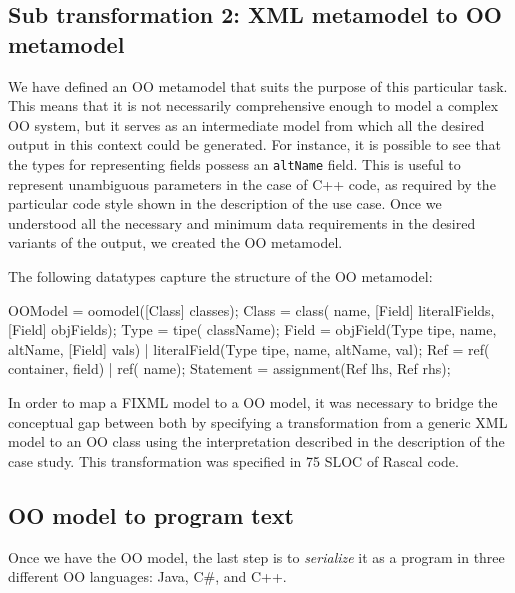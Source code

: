 \documentclass[submission,copyright,creativecommons]{eptcs}
\begin{document}
\subsection{Sub transformation 2: XML metamodel to OO metamodel}

We have defined an OO metamodel that suits the purpose of this particular task. This means that it is not necessarily comprehensive enough to model a complex OO system, but it serves as an intermediate model from which all the desired output in this context could be generated. For instance, it is possible to see that the types for representing fields possess an \texttt{altName} field. This is useful to represent unambiguous parameters in the case of C++ code, as required by the particular code style shown in the description of the use case. Once we understood all the necessary and minimum data requirements in the desired variants of the output, we created the OO metamodel.

The following datatypes capture the structure of the OO metamodel:
\begin{rascal}
 OOModel = oomodel([Class] classes);
 Class = class( name, [Field] literalFields, [Field] objFields);
 Type = tipe( className);
 Field = objField(Type tipe,  name,  altName, [Field] vals) 
           | literalField(Type tipe,  name,  altName,  val);
 Ref = ref( container,  field) | ref( name);
 Statement = assignment(Ref lhs, Ref rhs);
\end{rascal}

In order to map a FIXML model to a OO model, it was necessary to bridge the conceptual gap between both by specifying a transformation from a generic XML model to an OO class using the interpretation described in the description of the case study.  This transformation was specified in 75 SLOC of Rascal code.

\subsection{OO model to program text}

Once we have the OO model, the last step is to \emph{serialize} it as a program in three different OO languages: Java, C\#, and C++. 
\end{document}
